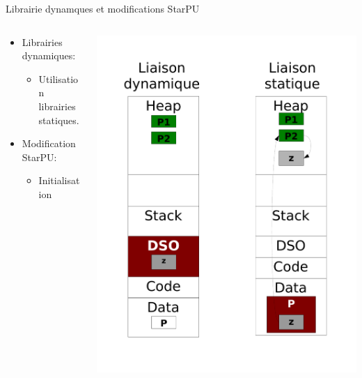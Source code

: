 \documentclass[11pt,xcolor=dvipsnames,presentation]{beamer}
\begin{document}
\begin{frame}[label=sec-5-2]{Librairie dynamques et modifications StarPU}
\begin{columns}
  \begin{column}{.6\linewidth}

\begin{itemize}
\item Librairies dynamiques:
\begin{itemize}
\item Utilisation librairies statiques.
\end{itemize}
\item Modification StarPU:
\begin{itemize}
\item Initialisation
\end{itemize}
\end{itemize}
  \end{column}
  \begin{column}{.35\linewidth}
    \includegraphics[width=\linewidth]{../Img/StaticDyn.pdf}
  \end{column}
\end{columns}
\end{frame}
\end{document}
